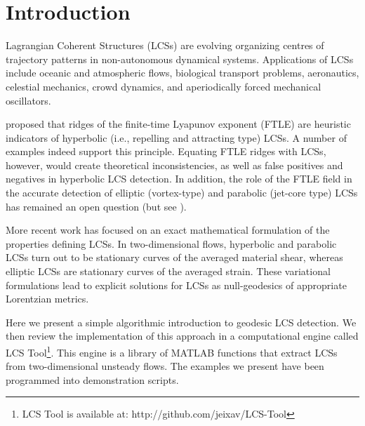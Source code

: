 \documentclass{elsarticle}
\begin{document}
\section{Introduction}

Lagrangian Coherent Structures (LCSs) are evolving organizing centres of trajectory patterns in non-autonomous dynamical systems\citep{haller00:_lagran,peacock13:_lagran,haller15:_langr_coher_struc}. Applications of LCSs include oceanic and atmospheric flows\citep{beron-vera13:_objec_agulh,koh02:_hyper}, biological transport problems\citep{wilson09:_lagran_reynol,tallapragada11:_lagran,huhn12:_south_indian_ocean_count_madag}, aeronautics\citep{tang10:_accur_lagran_hong_kong_inter_airpor}, celestial mechanics\citep{gawlik09:_lagran}, crowd dynamics\citep{ali07:_lagran_partic_dynam_approac_crowd}, and aperiodically forced mechanical oscillators\citep{hadjighasem13:_detec_kam}.

\citet{haller01:_distin} proposed that ridges of the finite-time Lyapunov exponent (FTLE) are heuristic indicators of hyperbolic (i.e., repelling and attracting type) LCSs. A number of examples indeed support this principle\citep{peacock13:_lagran}. Equating FTLE ridges with LCSs, however, would create theoretical inconsistencies, as well as false positives and negatives in hyperbolic LCS detection\citep{haller11:_lagran_coher_struc,norgard12:_secon_lagran_coher_struc}. In addition, the role of the FTLE field in the accurate detection of elliptic (vortex-type) and parabolic (jet-core type) LCSs has remained an open question (but see \citet{beron-vera10:_invar_lagran}).

More recent work has focused on an exact mathematical formulation of the properties defining LCSs\citep{haller11:_lagran_coher_struc,farazmand12:_comput_lagran,haller12:_geodes_theor_trans_barrier_two_dimen_flows,haller13:_coher_lagran,blazevski14:_hyper_ellip_trans_barrier_three}. In two-dimensional flows, hyperbolic and parabolic LCSs turn out to be stationary curves of the averaged material shear\citep{farazmand14:_shearless}, whereas elliptic LCSs are stationary curves of the averaged strain\citep{haller13:_coher_lagran}. These variational formulations lead to explicit solutions for LCSs as null-geodesics of appropriate Lorentzian metrics.

Here we present a simple algorithmic introduction to geodesic LCS detection.
We then review the implementation of this approach in a computational engine called LCS Tool\footnote{LCS Tool is available at: http://github.com/jeixav/LCS-Tool}. This engine is a library of MATLAB functions that extract LCSs from two-dimensional unsteady flows. The examples we present have been programmed into demonstration scripts.
\end{document}
